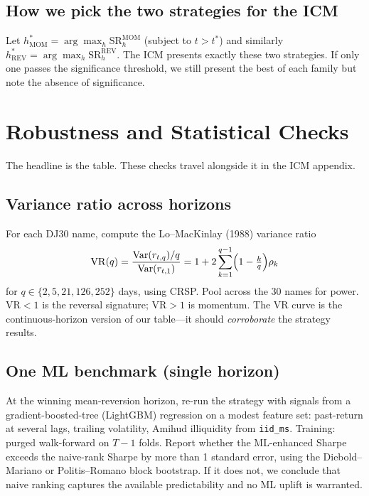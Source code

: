 \documentclass[11pt,letterpaper]{article}
\newcommand{\Var}{\mathrm{Var}}
\newcommand{\VR}{\mathrm{VR}}
\begin{document}
\subsection{How we pick the two strategies for the ICM}

Let $h^*_{\text{MOM}} = \arg\max_h \text{SR}^{\text{MOM}}_h$ (subject to $t>t^*$) and similarly $h^*_{\text{REV}} = \arg\max_h \text{SR}^{\text{REV}}_h$. The ICM presents exactly these two strategies. If only one passes the significance threshold, we still present the best of each family but note the absence of significance.

\section{Robustness and Statistical Checks}\label{sec:robust}

The headline is the table. These checks travel alongside it in the ICM appendix.

\subsection{Variance ratio across horizons}

For each DJ30 name, compute the Lo--MacKinlay (1988) variance ratio
\begin{equation}
\VR(q) = \frac{\Var(r_{t,q})/q}{\Var(r_{t,1})} = 1 + 2\sum_{k=1}^{q-1}\Bigl(1-\tfrac{k}{q}\Bigr)\rho_k
\end{equation}
for $q\in\{2,5,21,126,252\}$ days, using CRSP. Pool across the 30 names for power. $\VR<1$ is the reversal signature; $\VR>1$ is momentum. The VR curve is the continuous-horizon version of our table---it should \emph{corroborate} the strategy results.

\subsection{One ML benchmark (single horizon)}

At the winning mean-reversion horizon, re-run the strategy with signals from a gradient-boosted-tree (LightGBM) regression on a modest feature set: past-return at several lags, trailing volatility, Amihud illiquidity from \texttt{iid\_ms}. Training: purged walk-forward on $T-1$ folds. Report whether the ML-enhanced Sharpe exceeds the naive-rank Sharpe by more than 1 standard error, using the Diebold--Mariano or Politis--Romano block bootstrap. If it does not, we conclude that naive ranking captures the available predictability and no ML uplift is warranted.
\end{document}
